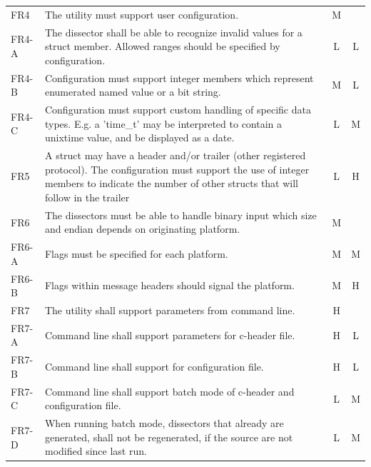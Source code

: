 \begin{table}[htbp]
{\begin{tabularx}{1.2\textwidth}{l X c c}
	\midrule
	FR4 & The utility must support user configuration.
		& M & \\
	FR4-A & The dissector shall be able to recognize invalid values for
		a struct member. Allowed ranges should be specified by configuration.
		& L & L \\
	FR4-B & Configuration must support integer members which represent
		enumerated named value or a bit string.
		& M & L \\
	FR4-C & Configuration must support custom handling of specific data
		types. E.g. a 'time\_t' may be interpreted to contain a unixtime value,
		and be displayed as a date.
		& L & M \\
	\midrule
	FR5 & A struct may have a header and/or trailer (other registered
		protocol). The configuration must support the use of integer members to
		indicate the number of other structs that will follow in the trailer
		& L & H \\
	\midrule
	FR6 & The dissectors must be able to handle binary input which size
		and endian depends on originating platform.
		& M & \\
	FR6-A & Flags must be specified for each platform.
		& M & M \\
	FR6-B & Flags within message headers should signal the platform.
		& M & H \\
	\midrule
	FR7 & The utility shall support parameters from command line.
		& H & \\
	FR7-A & Command line shall support parameters for c-header file.
		& H & L \\
	FR7-B & Command line shall support for configuration file.
		& H & L \\
	FR7-C & Command line shall support batch mode of c-header and
		configuration file.
		& L & M \\
	FR7-D & When running batch mode, dissectors that already are
		generated, shall not be regenerated, if the source are not modified
		since last run.
		& L & M \\
	\bottomrule
\end{tabularx}}
\end{table}

